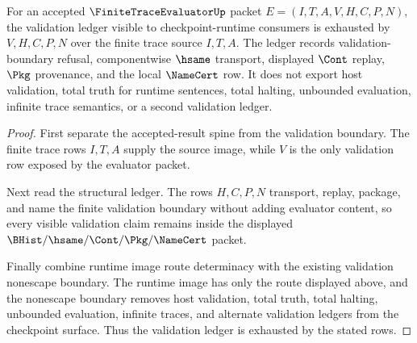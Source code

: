 \begin{theorem}
\label{thm:finite-trace-evaluator-validation-ledger-exhaustion}
For an accepted $\FiniteTraceEvaluatorUp$ packet $E=(I,T,A,V,H,C,P,N)$, the
validation ledger visible to checkpoint-runtime consumers is exhausted by
$V,H,C,P,N$ over the finite trace source $I,T,A$. The ledger records
validation-boundary refusal, componentwise $\hsame$ transport, displayed
$\Cont$ replay, $\Pkg$ provenance, and the local $\NameCert$ row. It does not
export host validation, total truth for runtime sentences, total halting,
unbounded evaluation, infinite trace semantics, or a second validation ledger.
\end{theorem}
\begin{proof}
First separate the accepted-result spine from the validation boundary. The
finite trace rows $I,T,A$ supply the source image, while $V$ is the only
validation row exposed by the evaluator packet.

Next read the structural ledger. The rows $H,C,P,N$ transport, replay,
package, and name the finite validation boundary without adding evaluator
content, so every visible validation claim remains inside the displayed
$\BHist/\hsame/\Cont/\Pkg/\NameCert$ packet.

Finally combine runtime image route determinacy with the existing validation
nonescape boundary. The runtime image has only the route displayed above, and
the nonescape boundary removes host validation, total truth, total halting,
unbounded evaluation, infinite traces, and alternate validation ledgers from
the checkpoint surface. Thus the validation ledger is exhausted by the stated
rows.
\end{proof}
